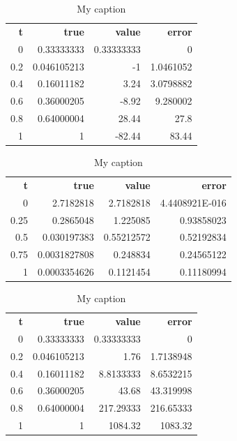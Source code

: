 \documentclass{article}
\begin{document}
\begin{table}[]
\centering
\caption{My caption}
\label{my-label}
\begin{tabular}{rrrr}
\textbf{t} & \textbf{true} & \textbf{value} & \textbf{error} \\

0          & 0.33333333    & 0.33333333     & 0              \\
0.2        & 0.046105213   & -1             & 1.0461052      \\
0.4        & 0.16011182    & 3.24           & 3.0798882      \\
0.6        & 0.36000205    & -8.92          & 9.280002       \\
0.8        & 0.64000004    & 28.44          & 27.8           \\
1          & 1             & -82.44         & 83.44         
\end{tabular}
\end{table}

\begin{table}[]
\centering
\caption{My caption}
\label{my-label}
\begin{tabular}{rrrr}
\textbf{t} & \textbf{true} & \textbf{value} & \textbf{error} \\
0          & 2.7182818     & 2.7182818      & 4.4408921E-016 \\
0.25       & 0.2865048     & 1.225085       & 0.93858023     \\
0.5        & 0.030197383   & 0.55212572     & 0.52192834     \\
0.75       & 0.0031827808  & 0.248834       & 0.24565122     \\
1          & 0.0003354626  & 0.1121454      & 0.11180994        
\end{tabular}
\end{table}

\begin{table}[]
\centering
\caption{My caption}
\label{my-label}
\begin{tabular}{rrrr}
\textbf{t} & \textbf{true} & \textbf{value} & \textbf{error} \\
0          & 0.33333333    & 0.33333333     & 0              \\
0.2        & 0.046105213   & 1.76           & 1.7138948      \\
0.4        & 0.16011182    & 8.8133333      & 8.6532215      \\
0.6        & 0.36000205    & 43.68          & 43.319998      \\
0.8        & 0.64000004    & 217.29333      & 216.65333      \\
1          & 1             & 1084.32        & 1083.32       
\end{tabular}
\end{table}
\end{document}
